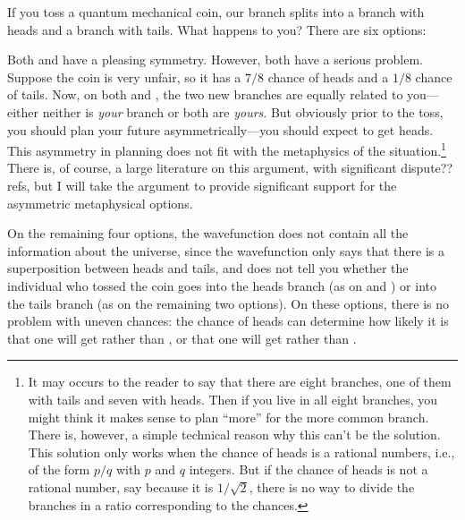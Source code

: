 If you toss a quantum mechanical coin, our branch splits into a branch with heads and a branch with tails. What happens
to you? There are six options:

Both  and  have a pleasing symmetry. However, both have a serious problem.
Suppose the coin is very unfair, so it has a $7/8$ chance of heads and a $1/8$ chance of tails. Now, on both 
 and , the two new branches are equally related to you---either neither is 
\textit{your} branch or both are \textit{yours}. But obviously prior to the toss, you should plan your future 
asymmetrically---you should expect to get heads. This asymmetry in planning does not fit with the metaphysics 
of the situation.\footnote{It may occurs to the reader to say that there are eight branches, one of them with 
tails and seven with heads. Then if you live in all eight branches, you might think it makes sense to plan 
``more'' for the more common branch. There is, however, a simple technical reason why this can't be the solution.
This solution only works when the chance of heads is a rational numbers, i.e., of the form $p/q$ with $p$ and $q$ integers.
But if the chance of heads is not a rational number, say because it is $1/\sqrt{2}$, there is no way to divide 
the branches in a ratio corresponding to the chances.} There is, of course, a large literature on this argument, with significant dispute??refs, but I will take the argument to provide significant support for the asymmetric metaphysical options. 

On the remaining four options, the wavefunction does not contain all the information about the universe, since the wavefunction
only says that there is a superposition between heads and tails, and does not tell you whether the individual who tossed
the coin goes into the heads branch (as on  and ) or into the tails branch (as on
the remaining two options). On these options, there is no problem with uneven chances: the chance of heads can determine 
how likely it is that one will get  rather than , or that one will get 
 rather than .

